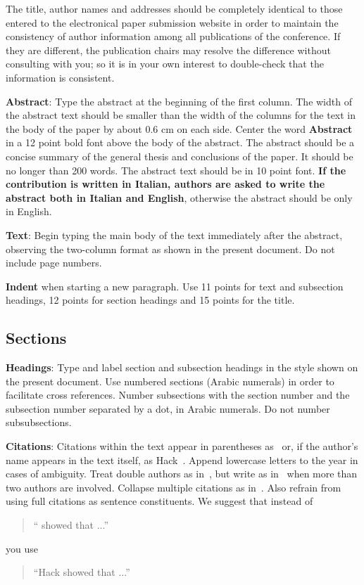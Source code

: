 \documentclass[11pt]{article}
\begin{document}
The title, author names and addresses should be completely identical
to those entered to the electronical paper submission website in order
to maintain the consistency of author information among all
publications of the conference. If they are different, the publication
chairs may resolve the difference without consulting with you; so it
is in your own interest to double-check that the information is
consistent.

{\bf Abstract}: \label{ssec:abs} Type the abstract at the beginning of the first
column. The width of the abstract text should be smaller than the
width of the columns for the text in the body of the paper by about
0.6 cm on each side. Center the word {\bf Abstract} in a 12 point bold
font above the body of the abstract. The abstract should be a concise
summary of the general thesis and conclusions of the paper. It should
be no longer than 200 words. The abstract text should be in 10 point font. {\bf  If the contribution is written in Italian, authors are asked to write the abstract  both in Italian and English}, otherwise the abstract should be only in English.

{\bf Text}: Begin typing the main body of the text immediately after
the abstract, observing the two-column format as shown in 
the present document. Do not include page numbers.

{\bf Indent} when starting a new paragraph. Use 11 points for text and 
subsection headings, 12 points for section headings and 15 points for
the title. 

\subsection{Sections}

{\bf Headings}: Type and label section and subsection headings in the
style shown on the present document.  Use numbered sections (Arabic
numerals) in order to facilitate cross references. Number subsections
with the section number and the subsection number separated by a dot,
in Arabic numerals. Do not number subsubsections.

{\bf Citations}: Citations within the text appear in parentheses
as~\cite{hack2011libera} or, if the author's name appears in the text
itself, as Hack~. Append lowercase letters
to the year in cases of ambiguity. Treat double authors as
in~\cite{jurafsky2012natural}, but write as in~\cite{cohn2020proceedings} when more than two authors are involved. Collapse multiple citations as
in~\cite{cohn2020proceedings,hack2011libera,jurafsky2012natural}. Also refrain from using full citations as sentence constituents. We suggest that instead of
\begin{quote}
  ``\cite{hack2011libera} showed that ...''
\end{quote}
you use
\begin{quote}
``Hack    showed that ...''
\end{quote}
\end{document}
